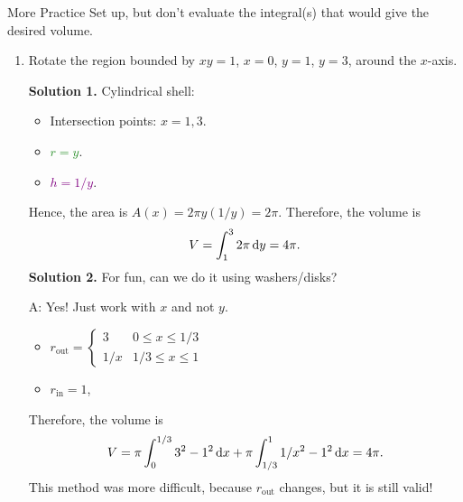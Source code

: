 \begin{Example}{More Practice}{}
    Set up, but don't evaluate the integral(s) that would give
    the desired volume.

    \begin{enumerate}[label=(\roman*)]
        \item Rotate the region bounded by $ xy=1 $, $ x=0 $, $ y=1 $, $ y=3 $,
              around the $ x $-axis.

              \begin{center}
              \end{center}

              \textbf{Solution 1.} Cylindrical shell:
              \begin{itemize}
                  \item Intersection points: $ x=1,3 $.
                  \item \textcolor{ForestGreen}{$ r=y $}.
                  \item \textcolor{Purple}{$ h=1/y $}.
              \end{itemize}
              Hence, the area is $ A(x)=2\pi y(1/y)=2\pi $. Therefore, the volume is
              \[ V=\int_{1}^{3} 2\pi\odif{y}=4\pi. \]
              \textbf{Solution 2.} For fun, can we do it using washers/disks?

              A\@: Yes! Just work with $ x $ and not $ y $.
              \begin{itemize}
                  \item $ \displaystyle  r_{\text{out}}=\begin{cases}
                                3   & 0\leqslant x\leqslant 1/3   \\
                                1/x & 1/3 \leqslant x \leqslant 1
                            \end{cases} $
                  \item $ r_{\text{in}}=1 $,
              \end{itemize}
              Therefore, the volume is
              \[ V=\pi\int_{0}^{1/3} 3^2-1^2\odif{x}
                  +\pi\int_{1/3}^{1} 1/x^2-1^2\odif{x}=4\pi. \]
              This method was more difficult, because $ r_{\text{out}} $ changes, but it is still valid!


\end{enumerate}
\end{Example}
